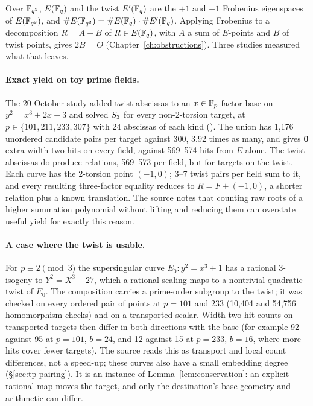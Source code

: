 Over $\mathbb{F}_{q^2}$, $E(\mathbb{F}_q)$ and the twist $E'(\mathbb{F}_q)$ are the $+1$ and
$-1$ Frobenius eigenspaces of $E(\mathbb{F}_{q^2})$, and $\#E(\mathbb{F}_{q^2})=\#E(\mathbb{F}_q)\cdot\#E'(\mathbb{F}_q)$.
Applying Frobenius to a decomposition $R=A+B$ of $R\in E(\mathbb{F}_q)$, with $A$
a sum of $E$-points and $B$ of twist points, gives $2B=O$
(Chapter~\ref{ch:obstructions}). Three studies measured what that leaves.

\paragraph{Exact yield on toy prime fields.} The 20 October study added
twist abscissas to an $x\in\mathbb{F}_p$ factor base on $y^2=x^3+2x+3$ and solved
$S_{3}$ for every non-2-torsion target, at $p\in\{101,211,233,307\}$ with
24 abscissas of each kind ().
The union has 1{,}176 unordered candidate pairs per target against 300,
$3.92$ times as many, and gives \textbf{0} extra width-two hits on every
field, against 569--574 hits from $E$ alone. The twist abscissas do produce
relations, 569--573 per field, but for targets on the twist. Each curve has
the 2-torsion point $(-1,0)$; 3--7 twist pairs per field sum to it, and
every resulting three-factor equality reduces to $R=F+(-1,0)$, a shorter
relation plus a known translation. The source notes that counting raw roots
of a higher summation polynomial without lifting and reducing them can
overstate useful yield for exactly this reason.

\paragraph{A case where the twist is usable.} For $p\equiv2\pmod3$ the
supersingular curve $E_0:y^2=x^3+1$ has a rational 3-isogeny to
$Y^2=X^3-27$, which a rational scaling maps to a nontrivial quadratic twist
of $E_0$. The composition carries a prime-order subgroup to the twist; it
was checked on every ordered pair of points at $p=101$ and $233$ (10{,}404
and 54{,}756 homomorphism checks) and on a transported scalar. Width-two hit
counts on transported targets then differ in both directions with the base
(for example 92 against 95 at $p=101$, $b=24$, and 12 against 15 at $p=233$,
$b=16$, where more hits cover fewer targets). The source reads this as
transport and local count differences, not a speed-up; these curves also
have a small embedding degree (\S\ref{sec:tp-pairing}). It is an instance of
Lemma~\ref{lem:conservation}: an explicit rational map moves the target,
and only the destination's base geometry and arithmetic can differ.

